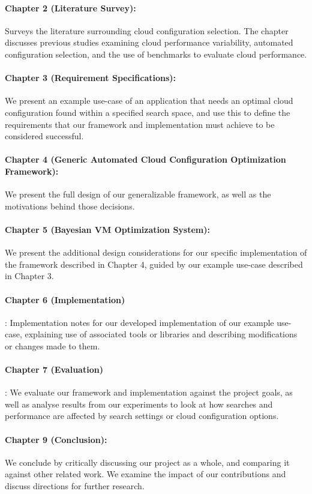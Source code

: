 \documentclass{report}
\begin{document}
\paragraph{Chapter 2 (Literature Survey):} Surveys the literature surrounding cloud configuration selection. The chapter discusses previous studies examining cloud performance variability, automated configuration selection, and the use of benchmarks to evaluate cloud performance.
\paragraph{Chapter 3 (Requirement Specifications):} We present an example use-case of an application that needs an optimal cloud configuration found within a specified search space, and use this to define the requirements that our framework and implementation must achieve to be considered successful.
\paragraph{Chapter 4 (Generic Automated Cloud Configuration Optimization Framework):} We present the full design of our generalizable framework, as well as the motivations behind those decisions.
\paragraph{Chapter 5 (Bayesian VM Optimization System):} We present the additional design considerations for our specific implementation of the framework described in Chapter 4, guided by our example use-case described in Chapter 3.
\paragraph{Chapter 6 (Implementation)}: Implementation notes for our developed implementation of our example use-case, explaining use of associated tools or libraries and describing modifications or changes made to them.
\paragraph{Chapter 7 (Evaluation)}: We evaluate our framework and implementation against the project goals, as well as analyse results from our experiments to look at how searches and performance are affected by search settings or cloud configuration options.
\paragraph{Chapter 9 (Conclusion):} We conclude by critically discussing our project as a whole, and comparing it against other related work. We examine the impact of our contributions and discuss directions for further research.
\end{document}
